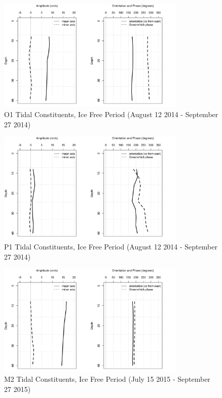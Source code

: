 \documentclass[12pt]{dforeport}
\begin{document}
\begin{figure}  
\centering
\includegraphics[width = 0.8\textwidth]{./figures/51_O1TC_if_2014.png}
\caption[O1 Tidal Constituents, Ice free, 2014]{O1 Tidal Constituents, Ice Free Period (August 12 2014 - September 27 2014)}
\label{f:o1_if_2014}
\end{figure}

\begin{figure}  
\centering
\includegraphics[width = 0.8\textwidth]{./figures/52_P1TC_if_2014.png}
\caption[P1 Tidal Constituents, Ice free, 2014]{P1 Tidal Constituents, Ice Free Period (August 12 2014 - September 27 2014)}
\label{f:p1_if_2014}
\end{figure}


\begin{figure}  
\centering
\includegraphics[width = 0.8\textwidth]{./figures/53_M2TC_if_2015.png}
\caption[M2 Tidal Constituents, Ice free, 2015]{M2 Tidal Constituents, Ice Free Period (July 15 2015 - September 27 2015)}
\label{f:m2_if_2015}
\end{figure}
\end{document}
